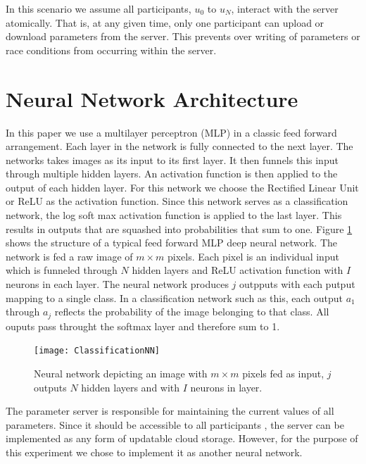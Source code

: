 \documentclass[conference]{IEEEtran}
\begin{document}
In this scenario we assume all participants, $u_0$ to $u_N$, interact with the server atomically.
That is, at any given time, only one participant can upload or download parameters from the server. This prevents over writing of parameters or race conditions from occurring within the server.

\section{Neural Network Architecture}

In this paper we use a multilayer perceptron (MLP) in a classic feed forward arrangement. Each layer in the network is fully connected to the next layer. The networks takes images as its input to its first layer. It then funnels this input through multiple hidden layers. An activation function is then applied to the output of each hidden layer. For this network we choose the Rectified Linear Unit or ReLU as the activation function. Since this network serves as a classification network, the log soft max activation function is applied to the last layer. This results in outputs that are squashed into probabilities that sum to one. 
Figure \ref{fig:ClassNN} shows the structure of a typical feed forward MLP deep neural network. The network is fed a raw image of  $m \times m$ pixels. Each pixel is an individual input which is funneled through $N$ hidden layers and ReLU activation function with $I$ neurons in each layer. The neural network produces $j$ outpputs with each putput mapping to a single class. In a classification network such as this, each output $a_1$ through $a_j$ reflects the probability of the image belonging to that class. All ouputs pass throught the softmax layer and therefore sum to 1. 

\begin{figure}[!h]
\texttt{[image: ClassificationNN]}
\caption{Neural network depicting an image with $m \times m$ pixels fed as input, $j$ outputs  $N$  hidden layers and with $I$ neurons in layer.}
\label{fig:ClassNN}
\end{figure}
The parameter server is responsible for maintaining the current values of all parameters. Since it should be accessible to all
participants , the server can be implemented as any form of updatable cloud storage. However, for the purpose of this experiment we
chose to implement it as another neural network. 
\end{document}
